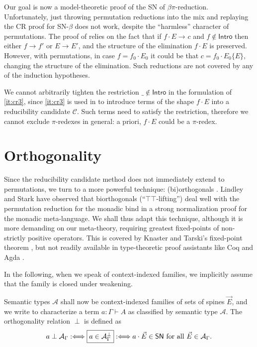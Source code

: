 \documentclass[a4paper,USenglish,cleveref, autoref, thm-restate]{lipics-v2019}
\newcommand{\defiff}{\mathrel{{{:}{\Longleftrightarrow}}}}
\newcommand{\red}[1][]{\longrightarrow_{#1}}
\newcommand{\A}{\mathcal{A}}
\newcommand{\C}{\mathcal{C}}
\newcommand{\SN}{\mathsf{SN}}
\newcommand{\Intro}{\mathsf{Intro}}
\begin{document}
Our goal is now a model-theoretic proof of the SN of $\beta\pi$-reduction.
Unfortunately,
just throwing permutation reductions into the mix and replaying the CR
proof for SN-$\beta$ does not work,
despite the ``harmless'' character of permutations.
The proof of  relies
on the fact that if $f \cdot E \red c$ and $f \not\in \Intro$ then
either $f \red f'$ or $E \red E'$, and the structure of the
elimination $f \cdot E$ is preserved.  However, with permutations, in
case $f = f_0 \cdot E_0$ it could be that $c = f_0 \cdot E_0\{E\}$,
changing the structure of the elimination.
Such reductions are not covered by any of the induction hypotheses.

We cannot arbitrarily tighten the restriction $\_ \not\in \Intro$ in
the formulation of \ref{it:cr3}, since \ref{it:cr3} is used in  to
introduce terms of the shape $f \cdot E$
into a reducibility candidate $\C$.  Such terms need to satisfy the
restriction, therefore we cannot exclude $\pi$-redexes in general: a
priori, $f \cdot E$ could be a $\pi$-redex.

\section{Orthogonality}
\label{sec:biortho}
\label{sec:ortho}

Since the reducibility candidate method does not immediately extend to
permutations, we turn to a more powerful technique: (bi)orthogonals
\cite{birkhoff:latticeTheory,pitts:mscs00,danosKrivine:csl00,girard:locusSolum,vouillonMellies:semanticTypes,abel:PhD}.
Lindley and Stark \cite{lindleyStark:tlca05} have observed that
biorthogonals (``$\top\top$-lifting'') deal well with the permutation
reduction for the monadic bind in a strong normalization proof for the
monadic meta-language.  We shall thus adapt this technique, although
it is more demanding on our meta-theory, requiring greatest
fixed-points of non-strictly positive operators.  This is covered by
Knaster and Tarski's fixed-point theorem \cite{tarski:fixpoint}, but
not readily available in type-theoretic proof assistants like Coq
\cite{coq:8120} and
Agda \cite{agda:261}.

In the following, when we speak of context-indexed families, we
implicitly assume that the family is closed under weakening.

Semantic types $\A$ shall now be context-indexed families of sets of
spines $\vec E$, and we write \fbox{$a \perp \A_\Gamma$} to
characterize a term $a : \Gamma \vdash A$ as classified by semantic
type $\A$.  The orthogonality relation $\perp$ is defined as
\[
  a \perp \A_\Gamma \defiff
  \fbox{$a \in \A_\Gamma^\perp$} \defiff
  a \cdot \vec E \in \SN \mbox{ for all } \vec E \in \A_\Gamma
  .
\]
\end{document}
